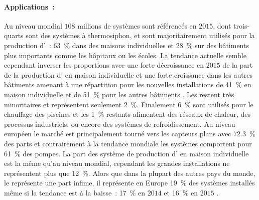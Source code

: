 \paragraph{Applications~:} %
\label{par:applications}
Au niveau mondial $108$ millions de systèmes sont référencés en $2015$, dont trois-quarts
sont des systèmes à thermosiphon, et sont majoritairement utilisés pour la production
d’~: \SI{63}{\percent} dans des maisons individuelles et \SI{28}{\percent} sur des bâtiments plus importants comme
les hôpitaux ou les écoles. La tendance actuelle semble cependant inverser les proportions
avec une forte décroissance en $2015$ de la part de la production d’ en maison individuelle
et une forte croissance dans les autres bâtiments amenant à une répartition pour les nouvelles installations
de \SI{41}{\percent} en maison individuelle et de \SI{51}{\percent} pour les autres bâtiments .
Les  restent très minoritaires et représentent seulement \SI{2}{\percent}.
Finalement \SI{6}{\percent} sont utilisés pour le chauffage des piscines et les \SI{1}{\percent}
restants alimentent des réseaux de chaleur, des processus industriels, ou encore des systèmes de
refroidissement.
Au niveau européen le marché est principalement tourné vers les capteurs plans avec \SI{72.3}{\percent}
des parts et contrairement à la tendance mondiale les systèmes comportent pour \SI{61}{\percent} des pompes.
La part des système de production d’ en maison individuelle est la même qu’au niveau mondial,
cependant les grandes installations ne représentent plus que \SI{12}{\percent}. Alors que
dans la plupart des autres pays du monde, le  représente une part infime, il
représente en Europe \SI{19}{\percent} des systèmes installés même si la tendance est à
la baisse~: \SI{17}{\percent} en $2014$ \parencite{Mauthner2016} et \SI{16}{\percent} en
$2015$ \parencite{Weiss2017}.


